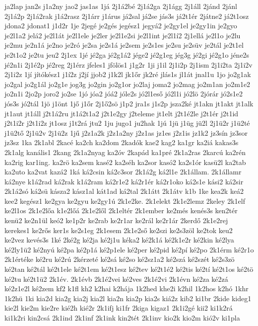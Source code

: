 {ja2lap
jan2s
j1a2ny
jao2
jas1as
1já
2j1á2bé
2j1á2ga
2j1ágg
2j1áll
2jánd
2jánl
2j1á2p
2j1á2rak
j1á2rasz
2j1árr
j1árus
já2sal
já2se
jás3s
já2t1ér
2játne2
já2t1osz
jdona2
jdonat1
j1d2r
1je
2jegé
je2gés
jegész1
jegyá2
je2gy1el
je2gy1in
je2gyo
je2l1a2
jelá2
je2l1át
je2l1ele
je2ler
je2l1e2si
je2l1int
je2l1í2
2j1ellá
je2l1o
je2lu
je2mu
je2n1á
je2no
je2ró
je2sa
je2s1á
je2sem
je2s1es
je2su
je2süv
je2tál
je2t1el
je2t1o2
je2tu
jeu2
2j1ex
1jé
jé2ga
jé2g1á2
jége2
jé2g1eg
jég3g
jé2gi
jé2g1o
jéne2s
jé2n1i
2j1é2p
jé2reg
2j1érz
jfeles1
jfölös1
j1g2r
1ji
j1il
2j1i2p
2j1ism
2j1i2ta
2j1i2v
2j1i2z
1jí
jítókész1
j1í2z
j2jí
jjob2
j1k2l
jk1őr
jk2ré
jlás1s
jl1át
jnal1u
1jo
jo2g1ak
jo2gal
jo2g1ál
jo2g1e
jog3g
jo2gin
jo2g1or
jo2laj
joma2
jo2mag
jo2m1an
jo2m1e2
jo2n1i
2jo2p
joro2
jo2se
1jó
jóa2
jóá2
jóle2s
jó2l1eső
jó2l1i
jó2lö
2jórár
jó2s1e2
jós3s
jó2tál
1jö
j1önt
1jő
j1őr
2j1ő2sö
j1p2
jra1s
j1s2p
jsza2ké
jt1akn
jt1akt
jt1alk
jt1aut
jt1áll
j2t1á2ru
jt1á2t1a2
j2t1e2gy
j2teleme
jt1elt
j2t1é2le
j2t1ér
j2t1id
j2t1i2r
j2t1i2z
jt1osz
j1t2rá
jtu2
1ju
jugo1
ju2hak
1jú
1jü
j1üg
jü2l
2j1ü2r
j1ü2té
j1ü2tő
2j1ü2v
2j1ü2z
1jű
j2z1a2k
j2z1a2ny
j2z1as
jz1es
j2z1is
jz1k2
jz3sín
jz3sor
jz3sz
1ka
2k1abl
2kacé
ka2ch
ka2dom
2kadók
kae2
kag2
ka1gr
ka2iá
kakas3s
2k1alg
kanális1
2kang
2k1a2nyag
ka2óv
2kapád
ka1pré
2k1a2ras
2karcú
ka2rén
ka2rig
kar1ing.
ka2rö
ka2sem
kasé2
ka2séh
ka2sor
kasó2
ka2s1ór
kasü2l
ka2tab
ka2uto
ka2vat
kazá2
1ká
ká2csin
ká2c3sor
2k1á2g
ká2l1e
2k1állam.
2k1államr
ká2nye
k1á2rad
ká2rak
k1á2ram
ká2r1e2
ká2r1ér
ká2r1oko
ká2s1e
kási2
ká2sir
2k1á2só
ká2sü
kásza2
kász1al
kát1ad
ká2tal
2k1átt
2k1átv
k1b
1ke
kea2k
keá2
kee2
kegész1
ke2gya
ke2gyu
ke2gy1ú
2k1e2ke.
2k1elekt
2k1e2lemz
2keley
2k1elf
ke2l1os
2k1e2lőa
k1e2lőá
2k1e2lől
2k1eltér
2k1ember
ke2més
kenés3s
ken2tér
kenü2
ke2n1ül
keó2
ke1p2r
ke2rab
ke2r1ar
ke2rál
ke2r1ár
2kerdő
2k1e2rej
kerekes1
ke2rős
ker1s
ke2s1eg
2k1esem
2k1e2ső
ke2szi
ke2s3zöl
ke2tok
keu2
ke2vez
kevés3s
1ké
2ké2g
ké2ja
ké2j1u
kéka2
ké2k1á
ké2k1e2r
ké2kin
ké2lya
ké2ly1ü2
ké2nyú
ké2pa
ké2p1á
ké2p1ele
ké2per
ké2pid
ké2pí
ké2po
2k1érm
ké2r1o
2k1értéke
ké2ru
ké2rú
2kérzeté
ké2sá
ké2so
ké2sz1a2
ké2szá
ké2szét
ké2s3zö
ké2tan
ké2tál
ké2t1ele
ké2t1em
ké2t1esz
ké2tev
ké2t1é2
ké2tis
ké2tí
ké2t1os
ké2tö
ké2tu
ké2t1ü2
2k1év.
2k1évb
2k1é2vei
ké2ves
2k1é2vi
2k1évn
ké2za
ké2zá
ké2z1e2l
ké2zem
kf2
k1fl
kh2
k2hai
k2hája
1k2hed
khe2i
k2hil
1k2hos
k2hó
1khr
1k2hü
1ki
kia2d
kia2g
kia2j
kia2l
kia2n
kia2p
kia2s
kiá2z
kib2
ki1br
2kide
kideg1
kie2l
kie2m
kie2re
kié2h
kié2r
2k1ifj
ki1fr
2kiga
kigaz1
2k1i2gé
kii2
ki1k2rá
ki1k2ri
kin2csá
2k1ind
2k1inf
2k1ink
kin2tét
2k1inv
kio2k
kio2m
kió2v
ki1pla
}
